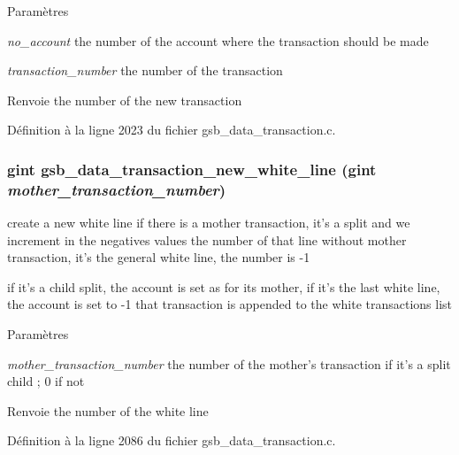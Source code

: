 \begin{DoxyParams}{Paramètres}
\item[{\em no\_\-account}]the number of the account where the transaction should be made \item[{\em transaction\_\-number}]the number of the transaction\end{DoxyParams}
\begin{DoxyReturn}{Renvoie}
the number of the new transaction 
\end{DoxyReturn}


Définition à la ligne 2023 du fichier gsb\_\-data\_\-transaction.c.

\subsubsection[{gsb\_\-data\_\-transaction\_\-new\_\-white\_\-line}]{\setlength{\rightskip}{0pt plus 5cm}gint gsb\_\-data\_\-transaction\_\-new\_\-white\_\-line (gint {\em mother\_\-transaction\_\-number})}\label{gsb__data__transaction_8c_a06ebb4be3d0f5e8ca2a53bbb74fb6ef8}
create a new white line if there is a mother transaction, it's a split and we increment in the negatives values the number of that line without mother transaction, it's the general white line, the number is -\/1

if it's a child split, the account is set as for its mother, if it's the last white line, the account is set to -\/1 that transaction is appended to the white transactions list


\begin{DoxyParams}{Paramètres}
\item[{\em mother\_\-transaction\_\-number}]the number of the mother's transaction if it's a split child ; 0 if not\end{DoxyParams}
\begin{DoxyReturn}{Renvoie}
the number of the white line 
\end{DoxyReturn}


Définition à la ligne 2086 du fichier gsb\_\-data\_\-transaction.c.

